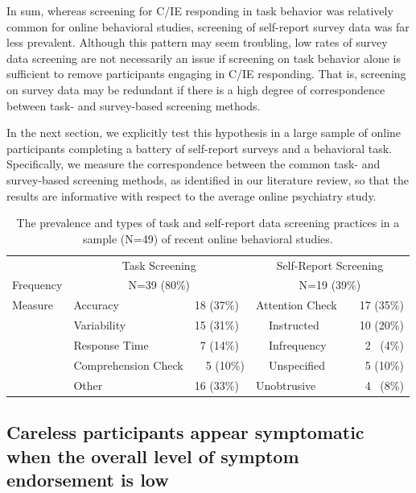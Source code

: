 \documentclass[a4paper,notitlepage,12pt]{article}
\begin{document}
In sum, whereas screening for C/IE responding in task behavior was relatively common for online behavioral studies, screening of self-report survey data was far less prevalent. Although this pattern may seem troubling, low rates of survey data screening are not necessarily an issue if screening on task behavior alone is sufficient to remove participants engaging in C/IE responding. That is, screening on survey data may be redundant if there is a high degree of correspondence between task- and survey-based screening methods. 

In the next section, we explicitly test this hypothesis in a large sample of online participants completing a battery of self-report surveys and a behavioral task. Specifically, we measure the correspondence between the common task- and survey-based screening methods, as identified in our literature review, so that the results are informative with respect to the average online psychiatry study.

\begin{table}[t]
\centering
\small
\setlength{\tabcolsep}{8pt}
\begin{tabular}{lllrllr}
\toprule
& \multicolumn{2}{c}{Task Screening} & \multicolumn{4}{c}{Self-Report Screening} \\
\cmidrule(lr){2-3} \cmidrule(lr){4-7}
Frequency & \multicolumn{2}{c}{N=39 (80\%)} & \multicolumn{4}{c}{N=19 (39\%)} \\
\midrule
Measure & Accuracy & 18 (37\%) & \multicolumn{2}{l}{Attention Check} & & 17 (35\%) \\
& Variability & 15 (31\%) & & Instructed & & 10 (20\%) \\
& Response Time & \ 7 (14\%) & & Infrequency & & 2 \, (4\%) \\
& Comprehension Check & \ \ 5 (10\%) & & Unspecified & & 5 (10\%) \\
& Other & 16 (33\%) & \multicolumn{2}{l}{Unobtrusive} & & \ 4 \, (8\%) \\
\bottomrule
\end{tabular}
\captionsetup{width=0.88\textwidth}
\caption{The prevalence and types of task and self-report data screening practices in a sample (N=49) of recent online behavioral studies.}
\label{tab:screening}
\end{table}

\subsection{Careless participants appear symptomatic when the overall level of symptom endorsement is low}
\end{document}
